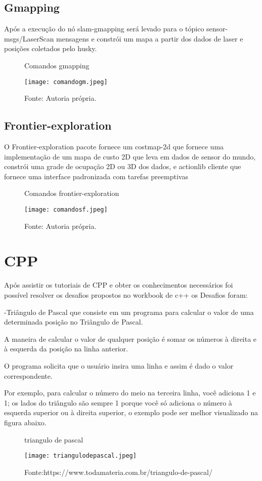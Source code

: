 \subsection{Gmapping}
Após a execução do nó slam-gmapping será levado para o tópico sensor-msgs/LaserScan mensagens e constrói um mapa a partir dos dados de laser e posições coletados pelo husky.
\begin{figure} [h!]	
    \centering
    \caption{Comandos gmapping}
    \texttt{[image: comandogm.jpeg]}
    \caption*{Fonte: Autoria própria.}
    \label{fig:gmapping}
\end{figure}
\subsection{Frontier-exploration}
O Frontier-exploration pacote fornece um costmap-2d que fornece uma implementação de um mapa de custo 2D que leva em dados de sensor do mundo, constrói uma grade de ocupação 2D ou 3D dos dados, e actionlib cliente que fornece uma interface padronizada com tarefas preemptivas
\begin{figure} [h!]	
    \centering
    \caption{Comandos frontier-exploration }
    \texttt{[image: comandosf.jpeg]}
    \caption*{Fonte: Autoria própria.}
    \label{fig:frontier-exploration}
\end{figure}
\section{CPP}
Após assistir os tutoriais de CPP e obter os conhecimentos necessários foi possível resolver os desafios propostos no workbook de c++ os Desafios foram: 

    -Triângulo de Pascal que consiste em um programa para calcular o valor de uma determinada posição no Triângulo de Pascal.

    A maneira de calcular o valor de qualquer posição é somar os números à direita e à esquerda da posição na linha anterior.

   O programa solicita que o usuário insira uma linha e assim é dado o valor correspondente.

   Por exemplo, para calcular o número do meio na terceira linha, você adiciona 1 e 1; os lados do triângulo são sempre 1 porque você só adiciona o número à esquerda superior ou à direita superior, o exemplo pode ser melhor visualizado na figura abaixo.

\begin{figure} [h!]	
    \centering
    \caption{triangulo de pascal}
    \texttt{[image: triangulodepascal.jpeg]}
    \caption*{Fonte:https://www.todamateria.com.br/triangulo-de-pascal/}
    \label{fig:triangulodepascal}
\end{figure}


